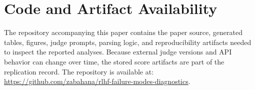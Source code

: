 \documentclass[11pt]{article}
\begin{document}
\section{Code and Artifact Availability}
The repository accompanying this paper contains the paper source, generated tables, figures, judge prompts, parsing logic, and reproducibility artifacts needed to inspect the reported analyses. Because external judge versions and API behavior can change over time, the stored score artifacts are part of the replication record. The repository is available at: \url{https://github.com/zabahana/rlhf-failure-modes-diagnostics}.
\end{document}
